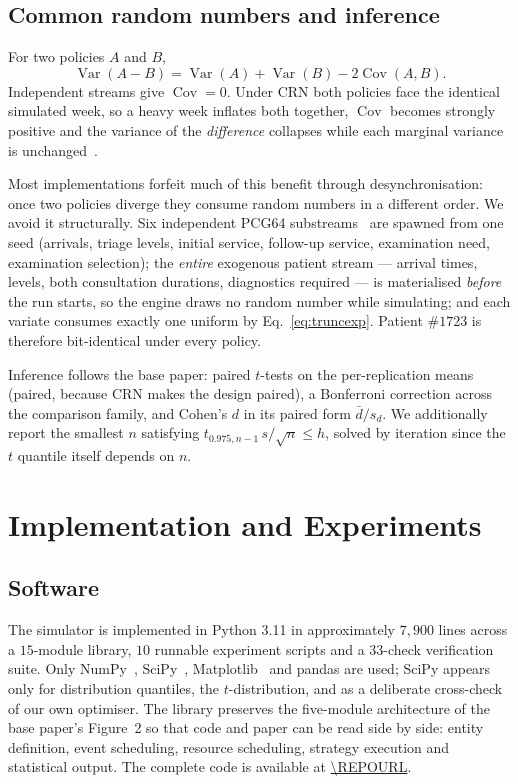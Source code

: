 \documentclass[sigconf,nonacm]{acmart}
\begin{document}
\subsection{Common random numbers and inference}
\label{sec:crn}
For two policies $A$ and $B$,
\begin{equation}
\operatorname{Var}(A-B) = \operatorname{Var}(A) + \operatorname{Var}(B)
                        - 2\operatorname{Cov}(A,B).
\label{eq:crn}
\end{equation}
Independent streams give $\operatorname{Cov}=0$. Under CRN both policies face
the identical simulated week, so a heavy week inflates both together,
$\operatorname{Cov}$ becomes strongly positive and the variance of the
\emph{difference} collapses while each marginal variance is
unchanged~\cite{law2015simulation}.

Most implementations forfeit much of this benefit through desynchronisation:
once two policies diverge they consume random numbers in a different order. We
avoid it structurally. Six independent PCG64 substreams~\cite{oneill2014pcg}
are spawned from one seed (arrivals, triage levels, initial service, follow-up
service, examination need, examination selection); the \emph{entire} exogenous
patient stream --- arrival times, levels, both consultation durations,
diagnostics required --- is materialised \emph{before} the run starts, so the
engine draws no random number while simulating; and each variate consumes
exactly one uniform by Eq.~\eqref{eq:truncexp}. Patient $\#1723$ is therefore
bit-identical under every policy.

Inference follows the base paper: paired $t$-tests on the per-replication means
(paired, because CRN makes the design paired), a Bonferroni correction across
the comparison family, and Cohen's $d$ in its paired form
$\bar{d}/s_d$. We additionally report the smallest $n$ satisfying
$t_{0.975,n-1}\,s/\sqrt{n} \le h$, solved by iteration since the $t$ quantile
itself depends on $n$.

\section{Implementation and Experiments}
\label{sec:impl}

\subsection{Software}
The simulator is implemented in Python 3.11 in approximately $7{,}900$ lines
across a $15$-module library, $10$ runnable experiment scripts and a
$33$-check verification suite. Only NumPy~\cite{harris2020numpy},
SciPy~\cite{virtanen2020scipy}, Matplotlib~\cite{hunter2007matplotlib} and
pandas are used; SciPy appears only for distribution quantiles, the
$t$-distribution, and as a deliberate cross-check of our own optimiser. The
library preserves the five-module architecture of the base paper's Figure~2 so
that code and paper can be read side by side: entity definition, event
scheduling, resource scheduling, strategy execution and statistical output.
The complete code is available at \url{\REPOURL}.
\end{document}
